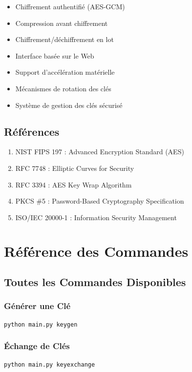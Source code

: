 \documentclass[12pt,a4paper]{report}
\begin{document}
\begin{itemize}
    \item Chiffrement authentifié (AES-GCM)
    \item Compression avant chiffrement
    \item Chiffrement/déchiffrement en lot
    \item Interface basée sur le Web
    \item Support d'accélération matérielle
    \item Mécanismes de rotation des clés
    \item Système de gestion des clés sécurisé
\end{itemize}

\section{Références}

\begin{enumerate}
    \item NIST FIPS 197 : Advanced Encryption Standard (AES)
    \item RFC 7748 : Elliptic Curves for Security
    \item RFC 3394 : AES Key Wrap Algorithm
    \item PKCS \#5 : Password-Based Cryptography Specification
    \item ISO/IEC 20000-1 : Information Security Management
\end{enumerate}

\appendix

\chapter{Référence des Commandes}

\section{Toutes les Commandes Disponibles}

\subsection{Générer une Clé}
\begin{lstlisting}[language=bash]
python main.py keygen
\end{lstlisting}

\subsection{Échange de Clés}
\begin{lstlisting}[language=bash]
python main.py keyexchange
\end{lstlisting}
\end{document}
